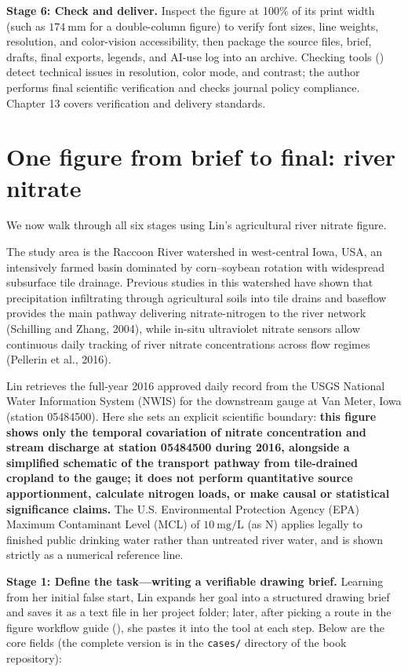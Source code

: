 \textbf{Stage 6: Check and deliver.} Inspect the figure at 100\% of its print width (such as $174\ \text{mm}$ for a double-column figure) to verify font sizes, line weights, resolution, and color-vision accessibility, then package the source files, brief, drafts, final exports, legends, and AI-use log into an archive. Checking tools () detect technical issues in resolution, color mode, and contrast; the author performs final scientific verification and checks journal policy compliance. Chapter 13 covers verification and delivery standards.

\section{One figure from brief to final: river nitrate}

We now walk through all six stages using Lin's agricultural river nitrate figure.

The study area is the Raccoon River watershed in west-central Iowa, USA, an intensively farmed basin dominated by corn--soybean rotation with widespread subsurface tile drainage. Previous studies in this watershed have shown that precipitation infiltrating through agricultural soils into tile drains and baseflow provides the main pathway delivering nitrate-nitrogen to the river network (Schilling and Zhang, 2004), while in-situ ultraviolet nitrate sensors allow continuous daily tracking of river nitrate concentrations across flow regimes (Pellerin et al., 2016).

Lin retrieves the full-year 2016 approved daily record from the USGS National Water Information System (NWIS) for the downstream gauge at Van Meter, Iowa (station 05484500). Here she sets an explicit scientific boundary: \textbf{this figure shows only the temporal covariation of nitrate concentration and stream discharge at station 05484500 during 2016, alongside a simplified schematic of the transport pathway from tile-drained cropland to the gauge; it does not perform quantitative source apportionment, calculate nitrogen loads, or make causal or statistical significance claims.} The U.S. Environmental Protection Agency (EPA) Maximum Contaminant Level (MCL) of $10\ \text{mg/L}$ (as N) applies legally to finished public drinking water rather than untreated river water, and is shown strictly as a numerical reference line.

\textbf{Stage 1: Define the task---writing a verifiable drawing brief.} Learning from her initial false start, Lin expands her goal into a structured drawing brief and saves it as a text file in her project folder; later, after picking a route in the \scidraw{} figure workflow guide (), she pastes it into the tool at each step. Below are the core fields (the complete version is in the \texttt{cases/} directory of the book repository):

